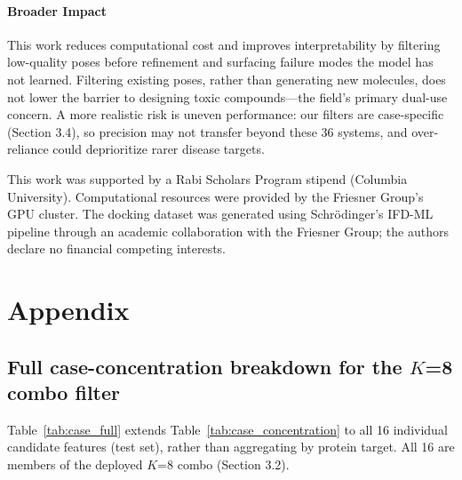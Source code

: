\documentclass{article}
\begin{document}
\paragraph{Broader Impact}
This work reduces computational cost and improves interpretability by filtering low-quality poses before refinement and surfacing failure modes the model has not learned. Filtering existing poses, rather than generating new molecules, does not lower the barrier to designing toxic compounds---the field's primary dual-use concern. A more realistic risk is uneven performance: our filters are case-specific (Section 3.4), so precision may not transfer beyond these 36 systems, and over-reliance could deprioritize rarer disease targets.

\begin{ack}
This work was supported by a Rabi Scholars Program stipend (Columbia University). Computational resources were provided by the Friesner Group's GPU cluster. The docking dataset was generated using Schr\"odinger's IFD-ML pipeline through an academic collaboration with the Friesner Group; the authors declare no financial competing interests.
\end{ack}




\newpage
\appendix
\section{Appendix}

\subsection{Full case-concentration breakdown for the $K$=8 combo filter}
\label{app:case-breakdown}

Table~\ref{tab:case_full} extends Table~\ref{tab:case_concentration} to all 16 individual candidate features (test set), rather than aggregating by protein target. All 16 are members of the deployed $K$=8 combo (Section 3.2).
\end{document}
